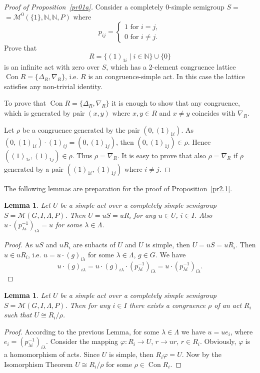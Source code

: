 \documentclass{birkau}
\numberwithin{equation}{section}
\theoremstyle{plain}
\newtheorem{lemma}[theorem]{Lemma}
\theoremstyle{definition}
\DeclareMathOperator{\Con}{Con}
\begin{document}
	\begin{proof}[Proof of Proposition~\ref{pr01a}]
	    Consider a completely 0-simple semigroup $S = $ \newline $ = \mathcal{M}^0(\{1\},\mathbb{N},\mathbb{N},P)$ where
	    $$ p_{ij} =
			\begin{cases}
				1 \text{ for } i = j,\\
				0 \text{ for } i \neq j.
			\end{cases}
		$$
		Prove that $$ R = \{ (1)_{1i} \mid i \in \mathbb{N} \} \cup \{0\} $$ is an infinite act with zero over $S$, which has a 2-element congruence lattice  $\Con R = \{ \Delta_R, \nabla_R\}$, i.e. $R$ is an congruence-simple act. In this case the lattice satisfies any non-trivial identity.
		
		To prove that $\Con R = \{ \Delta_R, \nabla_R \}$ it is enough to show that any congruence, which is generated by pair $(x,y)$ where $x,y \in R$ and $x \neq y$ coincides with $\nabla_R$.
		
		Let $\rho$ be a congruence generated by the pair $(0,(1)_{1i})$. As $(0,(1)_{1i}) \cdot (1)_{ij} = (0,(1)_{1j})$, then $(0,(1)_{1j}) \in \rho$. Hence $((1)_{1i},(1)_{1j}) \in \rho$. Thus $\rho = \nabla_R$. It is easy to prove that also $\rho = \nabla_R$ if $\rho$ generated by a pair $((1)_{1i},(1)_{1j})$ where $i \neq j$.
	\end{proof}
	
	The following lemmas are preparation for the proof of Proposition~\ref{pr2.1}.
	
	\begin{lemma}   \label{l2.1}
	    Let $U$ be a simple act over a completely simple semigroup $S = \mathcal{M}(G,I,\Lambda,P)$. Then $U = uS = u R_i$ for any $u \in U$, $i \in I$. Also $u \cdot
	    {(p_{\lambda i}^{-1})}_{i \lambda} = u$ for some $\lambda \in \Lambda$.
	\end{lemma}
	\begin{proof}
	    As $uS$ and $uR_i$ are subacts of $U$ and $U$ is simple, then $U = uS = u R_i$. Then $u \in u R_i$, i.e. $u = u \cdot (g)_{i \lambda}$ for some $\lambda \in \Lambda$, $g \in G$. We have $$ u \cdot {(g)}_{i \lambda} = u \cdot (g)_{i \lambda} \cdot {(p_{\lambda i}^{-1})}_{i \lambda} = u \cdot {(p_{\lambda i}^{-1})}_{i \lambda}.$$
	\end{proof}
	
	\begin{lemma} \label{l2.2}
	    Let $U$ be a simple act over a completely simple semigroup $S = \mathcal{M}(G,I,\Lambda,P)$. Then for any $i \in I$ there exists a congruence $\rho$ of an act $R_i$ such that $U \cong {R_i}/{\rho}$.
	\end{lemma}
	\begin{proof}
	    According to the previous Lemma, for some $\lambda \in \Lambda$ we have $u = u e_i$, where $e_i = (p_{\lambda i}^{-1})_{i \lambda}$. Consider the mapping $\varphi: R_i \rightarrow U$, $r \rightarrow ur$, $r \in R_i$. Obviously, $\varphi$ is a homomorphism of acts. Since $U$ is simple, then $R_i \varphi = U$. Now by the Isomorphism Theorem $U \cong {R_i}/{\rho}$ for some $\rho \in \Con R_i$.
	\end{proof}
	
\end{document}
